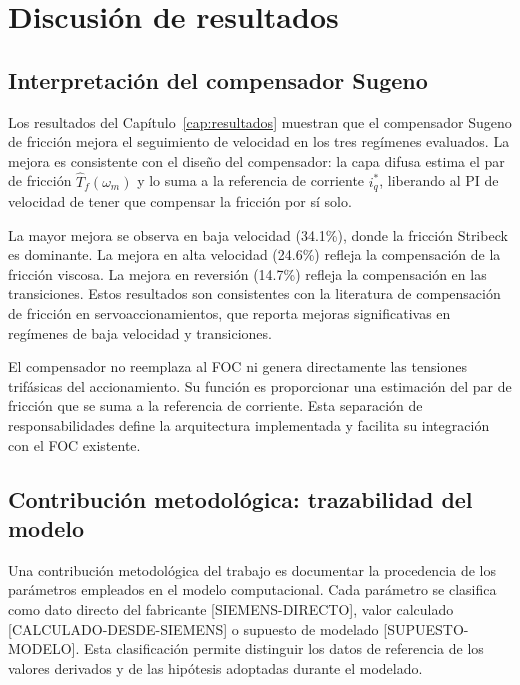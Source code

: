 \chapter{Discusión de resultados}
\label{cap:discusion}

\section{Interpretación del compensador Sugeno}
\label{sec:cap6_interpretacion}

Los resultados del Capítulo~\ref{cap:resultados} muestran que el compensador Sugeno de fricción mejora el seguimiento de velocidad en los tres regímenes evaluados. La mejora es consistente con el diseño del compensador: la capa difusa estima el par de fricción $\hat{T}_f(\omega_m)$ y lo suma a la referencia de corriente $i_q^*$, liberando al PI de velocidad de tener que compensar la fricción por sí solo.

La mayor mejora se observa en baja velocidad (34.1\%), donde la fricción Stribeck es dominante. La mejora en alta velocidad (24.6\%) refleja la compensación de la fricción viscosa. La mejora en reversión (14.7\%) refleja la compensación en las transiciones. Estos resultados son consistentes con la literatura de compensación de fricción en servoaccionamientos, que reporta mejoras significativas en regímenes de baja velocidad y transiciones.

El compensador no reemplaza al FOC ni genera directamente las tensiones trifásicas del accionamiento. Su función es proporcionar una estimación del par de fricción que se suma a la referencia de corriente. Esta separación de responsabilidades define la arquitectura implementada y facilita su integración con el FOC existente.

\section{Contribución metodológica: trazabilidad del modelo}
\label{sec:cap6_trazabilidad}

Una contribución metodológica del trabajo es documentar la procedencia de los parámetros empleados en el modelo computacional. Cada parámetro se clasifica como dato directo del fabricante [SIEMENS-DIRECTO], valor calculado [CALCULADO-DESDE-SIEMENS] o supuesto de modelado [SUPUESTO-MODELO]. Esta clasificación permite distinguir los datos de referencia de los valores derivados y de las hipótesis adoptadas durante el modelado.

